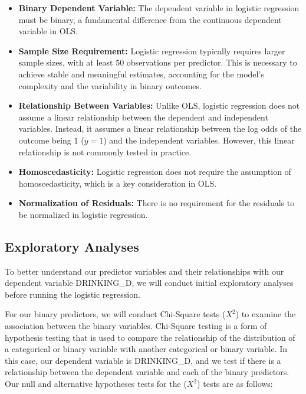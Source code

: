\documentclass[
]{article}
\begin{document}
\begin{itemize}
\item
  \textbf{Binary Dependent Variable:} The dependent variable in logistic
  regression must be binary, a fundamental difference from the
  continuous dependent variable in OLS.
\item
  \textbf{Sample Size Requirement:} Logistic regression typically
  requires larger sample sizes, with at least 50 observations per
  predictor. This is necessary to achieve stable and meaningful
  estimates, accounting for the model's complexity and the variability
  in binary outcomes.
\item
  \textbf{Relationship Between Variables:} Unlike OLS, logistic
  regression does not assume a linear relationship between the dependent
  and independent variables. Instead, it assumes a linear relationship
  between the log odds of the outcome being \(1\) (\(y=1\)) and the
  independent variables. However, this linear relationship is not
  commonly tested in practice.
\item
  \textbf{Homoscedasticity:} Logistic regression does not require the
  assumption of homoscedasticity, which is a key consideration in OLS.
\item
  \textbf{Normalization of Residuals:} There is no requirement for the
  residuals to be normalized in logistic regression.
\end{itemize}

\hypertarget{exploratory-analyses}{%
\subsection{Exploratory Analyses}\label{exploratory-analyses}}

To better understand our predictor variables and their relationships
with our dependent variable DRINKING\_D, we will conduct initial
exploratory analyses before running the logistic regression.

For our binary predictors, we will conduct Chi-Square tests (\(X^2\)) to
examine the association between the binary variables. Chi-Square testing
is a form of hypothesis testing that is used to compare the relationship
of the distribution of a categorical or binary variable with another
categorical or binary variable. In this case, our dependent variable is
DRINKING\_D, and we test if there is a relationship between the
dependent variable and each of the binary predictors. Our null and
alternative hypotheses tests for the (\(X^2\)) tests are as follows:
\end{document}
